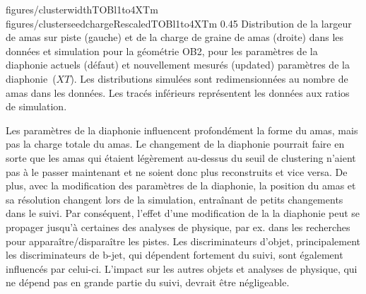                  {figures/clusterwidthTOBl1to4XTm}
                 {figures/clusterseedchargeRescaledTOBl1to4XTm} %
                 {0.45}       %
                 {Distribution de la largeur de amas sur piste (gauche) et de la charge  de graine de  amas (droite) dans les données et simulation pour la géométrie OB2, pour les paramètres de la diaphonie actuels (défaut) et nouvellement mesurés (updated) paramètres de la diaphonie~($XT$). Les distributions simulées sont redimensionnées au nombre de amas dans les données. Les tracés inférieurs représentent les données aux ratios de simulation. }



Les paramètres de la diaphonie influencent profondément la forme du amas, mais pas la charge totale du amas. Le changement de la diaphonie pourrait faire en sorte que les amas qui étaient légèrement au-dessus du seuil de clustering n’aient pas à le passer maintenant et ne soient donc plus reconstruits et vice versa. De plus, avec la modification des paramètres de la diaphonie, la position du amas et sa résolution changent lors de la simulation, entraînant de petits changements dans le suivi. Par conséquent, l'effet d'une modification de la la diaphonie peut se propager jusqu'à certaines des analyses de physique, par ex. dans les recherches pour apparaître/disparaître les pistes. Les discriminateurs d'objet, principalement les discriminateurs de b-jet, qui dépendent fortement du suivi, sont également influencés par celui-ci. L'impact sur les autres objets et analyses de physique, qui ne dépend pas en grande partie du suivi, devrait être négligeable.

